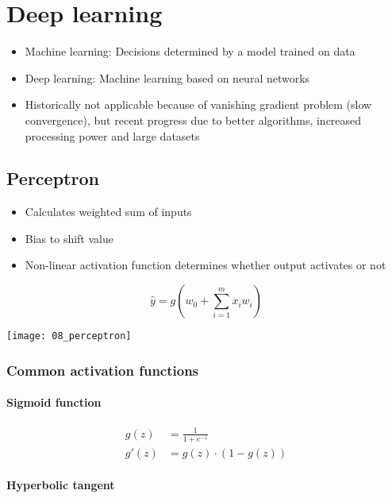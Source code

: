 \section{Deep learning}

\begin{itemize}
		\item Machine learning: Decisions determined by a model trained on data
		\item Deep learning: Machine learning based on neural networks
		\item Historically not applicable because of vanishing gradient problem
				(slow convergence), but recent progress due to better
				algorithms, increased processing power and large datasets
\end{itemize}

\subsection{Perceptron}

\begin{itemize}
		\item Calculates weighted sum of inputs
		\item Bias to shift value
		\item Non-linear activation function determines whether output activates or not
\end{itemize}

\[
		\hat{y} = g (w_0 + \sum_{i = 1}^m x_i w_i)
\]

\texttt{[image: 08\_perceptron]}

\subsubsection{Common activation functions}

\paragraph{Sigmoid function}

\begin{align*}
		g(z) & = \frac{1}{1 + e^{-z}} \\
		g'(z) & = g(z) \cdot (1 - g(z))
\end{align*}

\paragraph{Hyperbolic tangent}

